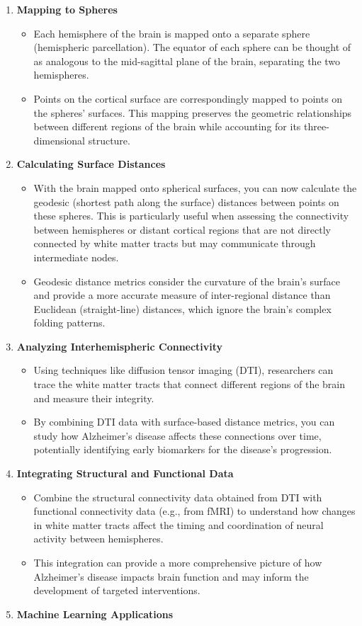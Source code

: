 \documentclass[twocolumn]{article}
\begin{document}
\begin{enumerate}
\item \textbf{Mapping to Spheres}
\begin{itemize}
\item Each hemisphere of the brain is mapped onto a separate sphere (hemispheric parcellation). The equator
of each sphere can be thought of as analogous to the mid-sagittal plane of the brain, separating the two hemispheres.
\item Points on the cortical surface are correspondingly mapped to points on the spheres' surfaces. This mapping preserves the geometric relationships between different regions of the brain while accounting for its three-dimensional structure.
\end{itemize}
\item \textbf{Calculating Surface Distances}
\begin{itemize}
\item With the brain mapped onto spherical surfaces, you can now calculate the geodesic (shortest path along
the surface) distances between points on these spheres. This is particularly useful when assessing the connectivity between hemispheres or distant cortical regions that are not directly connected by white matter tracts but may communicate through intermediate nodes.
\item Geodesic distance metrics consider the curvature of the brain's surface and provide a more accurate measure of inter-regional distance than Euclidean (straight-line) distances, which ignore the brain's
complex folding patterns.
\end{itemize}
\item \textbf{Analyzing Interhemispheric Connectivity}
\begin{itemize}
\item Using techniques like diffusion tensor imaging (DTI), researchers can trace the white matter tracts that
connect different regions of the brain and measure their integrity.
\item By combining DTI data with surface-based distance metrics, you can study how Alzheimer's disease
affects these connections over time, potentially identifying early biomarkers for the disease's progression.
\end{itemize}
\item \textbf{Integrating Structural and Functional Data}
\begin{itemize}
\item Combine the structural connectivity data obtained from DTI with functional connectivity data (e.g., from fMRI) to understand how changes in white matter tracts affect the timing and coordination of neural activity between hemispheres.
\item This integration can provide a more comprehensive picture of how Alzheimer's disease impacts brain function and may inform the development of targeted interventions.
\end{itemize}
\item \textbf{ Machine Learning Applications}

\end{enumerate}
\end{document}
